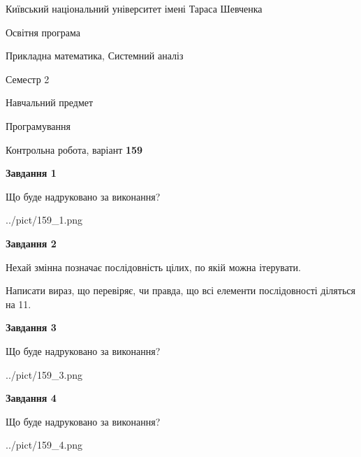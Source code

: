 \documentclass[12pt, ukrainian]{article}
\begin{document}
{{\begin {small}\par
{ \center  Київський національний університет імені Тараса Шевченка \par}
{\parbox {5 cm}{Освітня програма \hfill}{\parbox {8 cm}{Прикладна математика, Системний аналіз \hfill}}\parbox {5 cm}{\hfill Семестр 2}}\par
{\parbox {5 cm} {Навчальний предмет \hfill}\parbox {7 cm}{Програмування \hfill}\parbox {6cm}{\hfill}\par}\vspace{-7pt} \end{small}}{\center Контрольна робота, варіант  \No \textbf
{ 159 }\par}}
{
\begin {large}
{\begin {center}\textbf{Завдання 1}\end {center}}\par
Що буде надруковано за виконання?\par\par
\begin{center}
	{../pict/159_1.png}
\end{center}
\newpage

{\begin {center}\textbf{Завдання 2}\end {center}}\par
Нехай змінна  позначає послідовність цілих, по якій можна ітерувати.

Написати вираз, що перевіряє, чи правда, що всі елементи послідовності діляться на 11.\par
\newpage

{\begin {center}\textbf{Завдання 3}\end {center}}\par
Що буде надруковано за виконання?
\begin{center}
	{../pict/159_3.png}
\end{center}
\newpage

{\begin {center}\textbf{Завдання 4}\end {center}}\par
Що буде надруковано за виконання?\par
\begin{center}
	{../pict/159_4.png}
\end{center}
\newpage


\end{large}}
\end{document}
